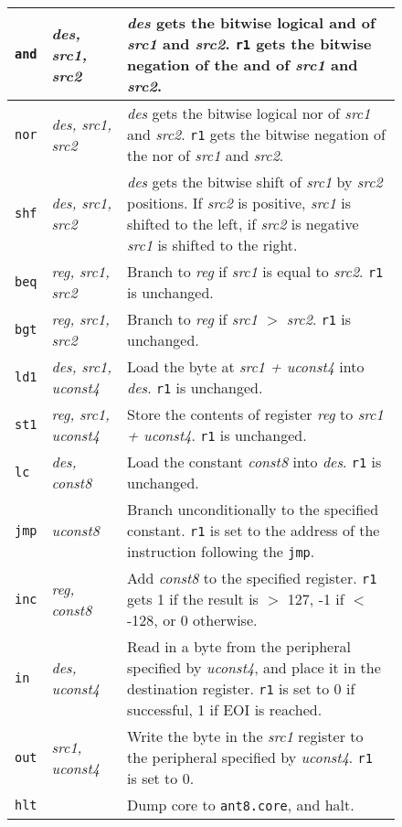 \begin{figure}[htp]
\begin{tabular}{|ll|p{4.5in}|}
\hline
        {\tt and}       & {\em des, src1, src2} &
                {\em des} gets the bitwise logical {\sc and} of
                {\em src1} and {\em src2}.  {\tt r1} gets the
                bitwise negation of the {\sc and} of {\em src1} and {\em src2}. \\
\hline
        {\tt nor}        & {\em des, src1, src2} &
                {\em des} gets the bitwise logical {\sc nor} of
                {\em src1} and {\em src2}.  {\tt r1} gets the
                bitwise negation of the {\sc nor}
		of {\em src1} and {\em src2}. \\
\hline
        {\tt shf}        & {\em des, src1, src2} &
		{\em des} gets the bitwise shift of {\em src1} by
		{\em src2} positions.  If {\em src2} is positive,
		{\em src1} is shifted to the left, if {\em src2}
		is negative {\em src1} is shifted to the right. \\
\hline
{\tt beq}       & {\em reg, src1, src2} &
        Branch to {\em reg} if {\em src1} is equal to {\em src2}.
        {\tt r1} is unchanged. \\
\hline
{\tt bgt}       & {\em reg, src1, src2} &
        Branch to {\em reg} if {\em src1} $>$ {\em src2}.
        {\tt r1} is unchanged. \\
\hline
{\tt ld1}        & {\em des, src1, uconst4} & 
        Load the byte at {\em src1 + uconst4} into {\em des}.
        {\tt r1} is unchanged.
        \\
\hline
{\tt st1}        & {\em reg, src1, uconst4} &
        Store the contents of register {\em reg} to {\em src1 + uconst4}.
        {\tt r1} is unchanged.
        \\
\hline
{\tt lc}        & {\em des, const8}      & 
        Load the constant {\em const8} into {\em des}.
        {\tt r1} is unchanged. \\
\hline
{\tt jmp}	& {\em uconst8}	&
	Branch unconditionally to the specified constant.
	{\tt r1} is set to the address
	of the instruction following the {\tt jmp}. \\

\hline

{\tt inc}	& {\em reg, const8}	&
	Add {\em const8} to the specified register.
                {\tt r1} gets 1 if the result is $>$ 127,
		-1 if $<$ -128, or 0 otherwise. \\
\hline

{\tt in}	& {\em des, uconst4}	&
	Read in a byte from the peripheral specified by {\em uconst4},
	and place it in the destination register. {\tt r1} is set to 0
	if successful, 1 if EOI is reached.
	\\
\hline
{\tt out}	& {\em src1, uconst4}	&
	Write the byte in the {\em src1} register to the peripheral
	specified by {\em uconst4}. {\tt r1} is set to 0. \\

\hline
        {\tt hlt}   & 			&
		Dump core to {\tt ant8.core}, and halt. \\

\hline 
\end{tabular}
\end{figure}
\vspace{3mm}

